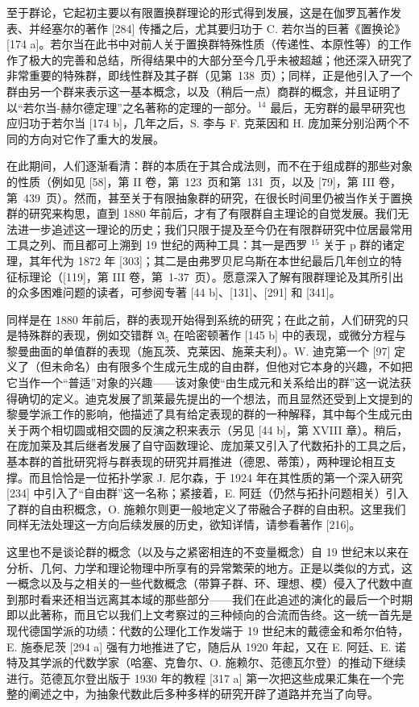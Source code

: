 至于群论，它起初主要以有限置换群理论的形式得到发展，这是在伽罗瓦著作发表、并经塞尔的著作 {[}284{]} 传播之后，尤其要归功于 C. 若尔当的巨著《置换论》{[}174 a{]}。若尔当在此书中对前人关于置换群特殊性质（传递性、本原性等）的工作作了极大的完善和总结，所得结果中的大部分至今几乎未被超越；他还深入研究了非常重要的特殊群，即线性群及其子群（见第~138~页）；同样，正是他引入了一个群由另一个群来表示这一基本概念，以及（稍后一点）商群的概念，并且证明了以“若尔当-赫尔德定理”之名著称的定理的一部分。\(^{14}\) 最后，无穷群的最早研究也应归功于若尔当 {[}174 b{]}，几年之后，S. 李与 F. 克莱因和 H. 庞加莱分别沿两个不同的方向对它作了重大的发展。

在此期间，人们逐渐看清：群的本质在于其合成法则，而不在于组成群的那些对象的性质（例如见 {[}58{]}，第 II 卷，第~123~页和第~131~页，以及 {[}79{]}，第 III 卷，第~439~页）。然而，甚至关于有限抽象群的研究，在很长时间里仍被当作关于置换群的研究来构思，直到 1880 年前后，才有了有限群自主理论的自觉发展。我们无法进一步追述这一理论的历史；我们只限于提及至今仍在有限群研究中位居最常用工具之列、而且都可上溯到 19 世纪的两种工具：其一是西罗 \(^{15}\) 关于 p 群的诸定理，其年代为 1872 年 {[}303{]}；其二是由弗罗贝尼乌斯在本世纪最后几年创立的特征标理论（{[}119{]}，第 III 卷，第~1-37~页）。愿意深入了解有限群理论及其所引出的众多困难问题的读者，可参阅专著 {[}44 b{]}、{[}131{]}、{[}291{]} 和 {[}341{]}。

同样是在 1880 年前后，群的表现开始得到系统的研究；在此之前，人们研究的只是特殊群的表现，例如交错群 \(\mathfrak{A}_5\) 在哈密顿著作 {[}145 b{]} 中的表现，或微分方程与黎曼曲面的单值群的表现（施瓦茨、克莱因、施莱夫利）。W. 迪克第一个 {[}97{]} 定义了（但未命名）由有限多个生成元生成的自由群，但他对它本身的兴趣，不如把它当作一个“普适”对象的兴趣——该对象使“由生成元和关系给出的群”这一说法获得确切的定义。迪克发展了凯莱最先提出的一个想法，而且显然还受到上文提到的黎曼学派工作的影响，他描述了具有给定表现的群的一种解释，其中每个生成元由关于两个相切圆或相交圆的反演之积来表示（另见 {[}44 b{]}，第 XVIII 章）。稍后，在庞加莱及其后继者发展了自守函数理论、庞加莱又引入了代数拓扑的工具之后，基本群的首批研究将与群表现的研究并肩推进（德恩、蒂策），两种理论相互支撑。而且恰恰是一位拓扑学家 J. 尼尔森，于 1924 年在其性质的第一个深入研究 {[}234{]} 中引入了“自由群”这一名称；紧接着，E. 阿廷（仍然与拓扑问题相关）引入了群的自由积概念，O. 施赖尔则更一般地定义了带融合子群的自由积。这里我们同样无法处理这一方向后续发展的历史，欲知详情，请参看著作 {[}216{]}。

这里也不是谈论群的概念（以及与之紧密相连的不变量概念）自 19 世纪末以来在分析、几何、力学和理论物理中所享有的异常繁荣的地方。正是以类似的方式，这一概念以及与之相关的一些代数概念（带算子群、环、理想、模）侵入了代数中直到那时看来还相当远离其本域的那些部分——我们在此追述的演化的最后一个时期即以此著称，而且它以我们上文考察过的三种倾向的合流而告终。这一统一首先是现代德国学派的功绩：代数的公理化工作发端于 19 世纪末的戴德金和希尔伯特，E. 施泰尼茨 {[}294 a{]} 强有力地推进了它，随后从 1920 年起，又在 E. 阿廷、E. 诺特及其学派的代数学家（哈塞、克鲁尔、O. 施赖尔、范德瓦尔登）的推动下继续进行。范德瓦尔登出版于 1930 年的教程 {[}317 a{]} 第一次把这些成果汇集在一个完整的阐述之中，为抽象代数此后多种多样的研究开辟了道路并充当了向导。
